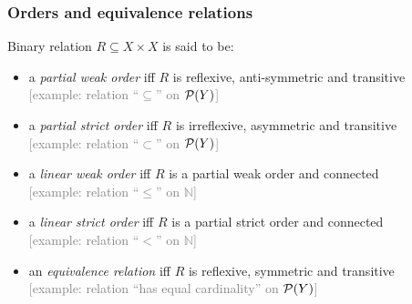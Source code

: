 \documentclass[fleqn,10pt,serif,xcolor=svgnames,xcolor=table,aspectratio=169]{beamer}
\newcommand{\mygray}[1]{\textcolor{gray}{#1}}
\begin{document}
\begin{frame}
  \frametitle{Orders and equivalence relations}
  Binary relation $R \subseteq X \times X$ is said to be:

  \begin{itemize}

    \item  a \textit{partial weak order} iff $R$ is reflexive, anti-symmetric and transitive \\
    \hfill \mygray{[example: relation ``$\subseteq$'' on $\mathcal{P}(Y)$]}
    \item  a \textit{partial strict order} iff $R$ is irreflexive, asymmetric and transitive \\
    \hfill \mygray{[example: relation ``$\subset$'' on $\mathcal{P}(Y)$]}
    \item  a \textit{linear weak order} iff $R$ is a partial weak order and connected \\
    \hfill \mygray{[example: relation ``$\le$'' on $\mathds{N}$]}
    \item  a \textit{linear strict order} iff $R$ is a partial strict order and connected \\
    \hfill \mygray{[example: relation ``$<$'' on $\mathds{N}$]}
    \item an \textit{equivalence relation} iff $R$ is reflexive, symmetric and transitive \\
    \hfill \mygray{[example: relation ``has equal cardinality'' on $\mathcal{P}(Y)$]}

  \end{itemize}

\end{frame}
\end{document}
